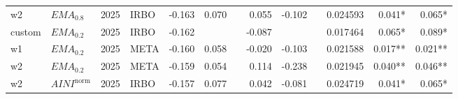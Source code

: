 \begin{tabular}{@{}llllrrrrrrrrr@{}}
w2 & $EMA_{0.8}$ & 2025 & IRBO & -0.163 & 0.070 &  & 0.055 & -0.102 &  & 0.024593 & 0.041* & 0.065* \\
custom & $EMA_{0.2}$ & 2025 & IRBO & -0.162 &  &  & -0.087 &  &  & 0.017464 & 0.065* & 0.089* \\
w1 & $EMA_{0.2}$ & 2025 & META & -0.160 & 0.058 &  & -0.020 & -0.103 &  & 0.021588 & 0.017** & 0.021** \\
w2 & $EMA_{0.2}$ & 2025 & META & -0.159 & 0.054 &  & 0.114 & -0.238 &  & 0.021945 & 0.040** & 0.046** \\
w2 & $AINI^{\mathrm{norm}}$ & 2025 & IRBO & -0.157 & 0.077 &  & 0.042 & -0.081 &  & 0.024719 & 0.041* & 0.065* \\
\bottomrule
\end{tabular}
